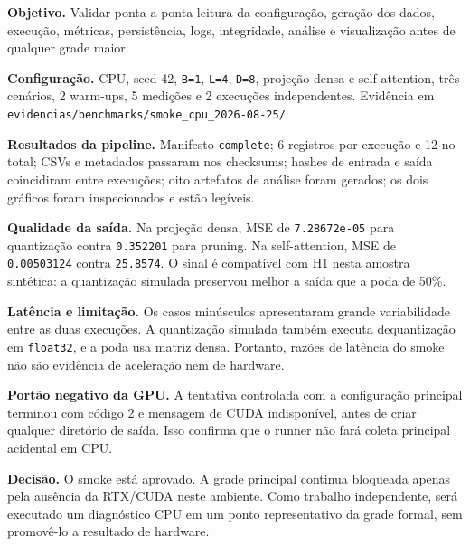 \textbf{Objetivo.} Validar ponta a ponta leitura da configuração, geração dos dados, execução, métricas, persistência, logs, integridade, análise e visualização antes de qualquer grade maior.






\textbf{Configuração.} CPU, seed 42, \texttt{B=1}, \texttt{L=4}, \texttt{D=8}, projeção densa e self-attention, três cenários, 2 warm-ups, 5 medições e 2 execuções independentes. Evidência em \texttt{evidencias/\allowbreak{}benchmarks/\allowbreak{}smoke\_\allowbreak{}cpu\_\allowbreak{}2026-08-25/\allowbreak{}}.






\textbf{Resultados da pipeline.} Manifesto \texttt{complete}; 6 registros por execução e 12 no total; CSVs e metadados passaram nos checksums; hashes de entrada e saída coincidiram entre execuções; oito artefatos de análise foram gerados; os dois gráficos foram inspecionados e estão legíveis.






\textbf{Qualidade da saída.} Na projeção densa, MSE de \texttt{7.\allowbreak{}28672e-05} para quantização contra \texttt{0.\allowbreak{}352201} para pruning. Na self-attention, MSE de \texttt{0.\allowbreak{}00503124} contra \texttt{25.\allowbreak{}8574}. O sinal é compatível com H1 nesta amostra sintética: a quantização simulada preservou melhor a saída que a poda de 50\%.






\textbf{Latência e limitação.} Os casos minúsculos apresentaram grande variabilidade entre as duas execuções. A quantização simulada também executa dequantização em \texttt{float32}, e a poda usa matriz densa. Portanto, razões de latência do smoke não são evidência de aceleração nem de hardware.






\textbf{Portão negativo da GPU.} A tentativa controlada com a configuração principal terminou com código 2 e mensagem de CUDA indisponível, antes de criar qualquer diretório de saída. Isso confirma que o runner não fará coleta principal acidental em CPU.






\textbf{Decisão.} O smoke está aprovado. A grade principal continua bloqueada apenas pela ausência da RTX/CUDA neste ambiente. Como trabalho independente, será executado um diagnóstico CPU em um ponto representativo da grade formal, sem promovê-lo a resultado de hardware.



